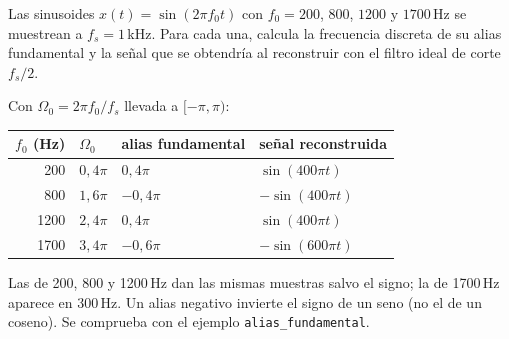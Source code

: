 \documentclass[11pt,a4paper]{scrartcl}
\begin{document}
\begin{ejercicio}
  Las sinusoides $x(t)=\sin(2\pi f_0t)$ con $f_0=200$, $800$, $1200$ y $1700$\,Hz se muestrean a $f_s=1$\,kHz. Para cada una, calcula la frecuencia discreta de su alias fundamental y la señal que se obtendría al reconstruir con el filtro ideal de corte $f_s/2$.
\end{ejercicio}
\begin{solucion}
  Con $\Omega_0=2\pi f_0/f_s$ llevada a $[-\pi,\pi)$:
  \begin{center}
    \begin{tabular}{@{}rlll@{}}
      \toprule
      $f_0$ (Hz) & $\Omega_0$ & alias fundamental & señal reconstruida\\\midrule
      200 & $0{,}4\pi$ & $0{,}4\pi$ & $\sin(400\pi t)$\\
      800 & $1{,}6\pi$ & $-0{,}4\pi$ & $-\sin(400\pi t)$\\
      1200 & $2{,}4\pi$ & $0{,}4\pi$ & $\sin(400\pi t)$\\
      1700 & $3{,}4\pi$ & $-0{,}6\pi$ & $-\sin(600\pi t)$\\\bottomrule
    \end{tabular}
  \end{center}
  Las de 200, 800 y 1200\,Hz dan las mismas muestras salvo el signo; la de 1700\,Hz aparece en 300\,Hz. Un alias negativo invierte el signo de un seno (no el de un coseno). Se comprueba con el ejemplo \texttt{alias\_fundamental}.
\end{solucion}
\end{document}
